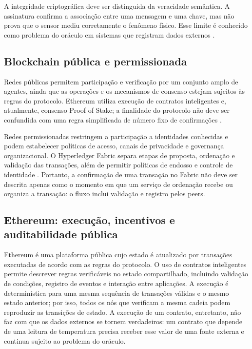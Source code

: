 \documentclass[10pt,a4paper,twocolumn]{article}
\begin{document}
A integridade criptográfica deve ser distinguida da veracidade semântica. A assinatura confirma a associação entre uma mensagem e uma chave, mas não prova que o sensor mediu corretamente o fenômeno físico. Esse limite é conhecido como problema do oráculo em sistemas que registram dados externos \cite{Christidis2016,Yaga2018}.

\subsection{Blockchain pública e permissionada}
Redes públicas permitem participação e verificação por um conjunto amplo de agentes, ainda que as operações e os mecanismos de consenso estejam sujeitos às regras do protocolo. Ethereum utiliza execução de contratos inteligentes e, atualmente, consenso Proof of Stake; a finalidade do protocolo não deve ser confundida com uma regra simplificada de número fixo de confirmações \cite{Wood2014,EthereumDocs}.

Redes permissionadas restringem a participação a identidades conhecidas e podem estabelecer políticas de acesso, canais de privacidade e governança organizacional. O Hyperledger Fabric separa etapas de proposta, ordenação e validação das transações, além de permitir políticas de endosso e controle de identidade \cite{Androulaki2018,FabricDocs}. Portanto, a confirmação de uma transação no Fabric não deve ser descrita apenas como o momento em que um serviço de ordenação recebe ou organiza a transação: o fluxo inclui validação e registro pelos peers.


\subsection{Ethereum: execução, incentivos e auditabilidade pública}
Ethereum é uma plataforma pública cujo estado é atualizado por transações executadas de acordo com as regras do protocolo. O uso de contratos inteligentes permite descrever regras verificáveis no estado compartilhado, incluindo validação de condições, registro de eventos e interação entre aplicações. A execução é determinística para uma mesma sequência de transações válidas e o mesmo estado anterior; por isso, todos os nós que verificam a mesma cadeia podem reproduzir as transições de estado. A execução de um contrato, entretanto, não faz com que os dados externos se tornem verdadeiros: um contrato que depende de uma leitura de temperatura precisa receber esse valor de uma fonte externa e continua sujeito ao problema do oráculo.
\end{document}
